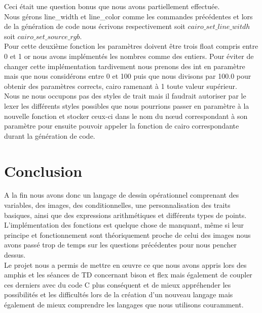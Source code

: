 \documentclass[a4paper,titlepage]{article}
\begin{document}
Ceci était une question bonus que nous avons partiellement effectuée.\\

Nous gérons line\_width et line\_color comme les commandes précédentes et lors de la génération de code nous écrivons respectivement soit $cairo\_set\_line\_witdh$ soit $cairo\_set\_source\_rgb$.\\
Pour cette deuxième fonction les paramètres doivent être trois float compris entre 0 et 1 or nous avons implémentés les nombres comme des entiers. Pour éviter de changer cette implémentation tardivement nous prenons des int en paramètre mais que nous considérons entre 0 et 100 puis que nous divisons par 100.0 pour obtenir des paramètres corrects, cairo ramenant à 1 toute valeur supérieur.\\
Nous ne nous occupons pas des styles de trait mais il faudrait autoriser par le lexer les différents styles possibles que nous pourrions passer en paramètre à la nouvelle fonction et stocker ceux-ci dans le nom du nœud correspondant à son paramètre pour ensuite pouvoir appeler la fonction de cairo correspondante durant la génération de code.

\newpage
\section{Conclusion}

A la fin nous avons donc un langage de dessin opérationnel comprenant des variables, des images, des conditionnelles, une personnalisation des traits basiques, ainsi que des expressions arithmétiques et différents types de points.\\
L'implémentation des fonctions est quelque chose de manquant, même si leur principe et fonctionnement sont théoriquement proche de celui des images nous avons passé trop de temps sur les questions précédentes pour nous pencher dessus.\\

Le projet nous a permis de mettre en œuvre ce que nous avons appris lors des amphis et les séances de TD concernant bison et flex mais également de coupler ces derniers avec du code C plus conséquent et de mieux appréhender les possibilités et les difficultés lors de la création d'un nouveau langage mais également de mieux comprendre les langages que nous utilisons couramment.
\end{document}
